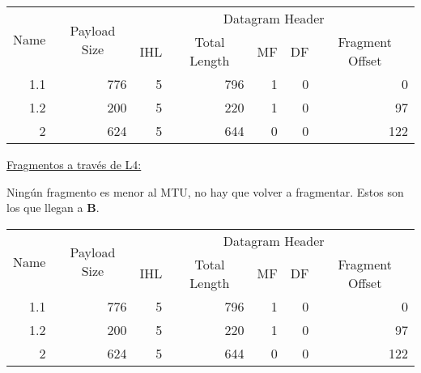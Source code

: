 \begin{table}[H]
    \renewcommand{\arraystretch}{1.5}
    \centering
    \begin{tabular}{|c|c|crrrr|}
    \hline
    \multirow{2}{*}{Name} & \multirow{2}{*}{Payload Size} & \multicolumn{5}{c|}{Datagram Header} \\ \cline{3-7} 
     &  & \multicolumn{1}{c|}{IHL} & \multicolumn{1}{c|}{Total Length} & \multicolumn{1}{c|}{MF} & \multicolumn{1}{c|}{DF} & \multicolumn{1}{c|}{Fragment Offset} \\ \hline
    \multicolumn{1}{|r|}{1.1} & \multicolumn{1}{r|}{776} & \multicolumn{1}{r|}{5} & \multicolumn{1}{r|}{796} & \multicolumn{1}{r|}{1} & \multicolumn{1}{r|}{0} & 0 \\ \hline
    \multicolumn{1}{|r|}{1.2} & \multicolumn{1}{r|}{200} & \multicolumn{1}{r|}{5} & \multicolumn{1}{r|}{220} & \multicolumn{1}{r|}{1} & \multicolumn{1}{r|}{0} & 97 \\ \hline
    \multicolumn{1}{|r|}{2} & \multicolumn{1}{r|}{624} & \multicolumn{1}{r|}{5} & \multicolumn{1}{r|}{644} & \multicolumn{1}{r|}{0} & \multicolumn{1}{r|}{0} & 122 \\ \hline
    \end{tabular}
    \end{table}

\noindent
\underline{Fragmentos a través de L4:}

\skipline
Ningún fragmento es menor al MTU, no hay que volver a fragmentar. Estos son los que llegan a \textbf{B}.

\begin{table}[H]
    \renewcommand{\arraystretch}{1.5}
    \centering
    \begin{tabular}{|c|c|crrrr|}
    \hline
    \multirow{2}{*}{Name} & \multirow{2}{*}{Payload Size} & \multicolumn{5}{c|}{Datagram Header} \\ \cline{3-7} 
     &  & \multicolumn{1}{c|}{IHL} & \multicolumn{1}{c|}{Total Length} & \multicolumn{1}{c|}{MF} & \multicolumn{1}{c|}{DF} & \multicolumn{1}{c|}{Fragment Offset} \\ \hline
    \multicolumn{1}{|r|}{1.1} & \multicolumn{1}{r|}{776} & \multicolumn{1}{r|}{5} & \multicolumn{1}{r|}{796} & \multicolumn{1}{r|}{1} & \multicolumn{1}{r|}{0} & 0 \\ \hline
    \multicolumn{1}{|r|}{1.2} & \multicolumn{1}{r|}{200} & \multicolumn{1}{r|}{5} & \multicolumn{1}{r|}{220} & \multicolumn{1}{r|}{1} & \multicolumn{1}{r|}{0} & 97 \\ \hline
    \multicolumn{1}{|r|}{2} & \multicolumn{1}{r|}{624} & \multicolumn{1}{r|}{5} & \multicolumn{1}{r|}{644} & \multicolumn{1}{r|}{0} & \multicolumn{1}{r|}{0} & 122 \\ \hline
    \end{tabular}
\end{table}


